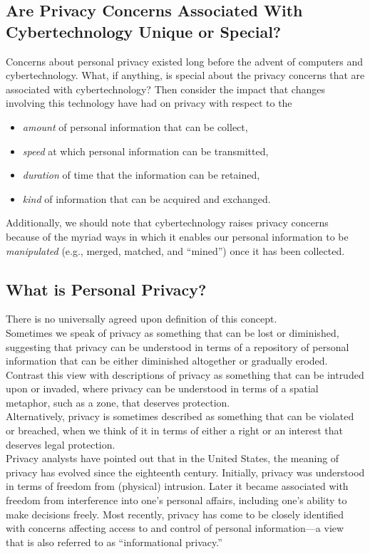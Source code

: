 \documentclass[12pt]{article}
\theoremstyle{definition}
\begin{document}
\subsection{Are Privacy Concerns Associated With Cybertechnology Unique or Special?}
Concerns about personal privacy existed long before the advent of computers and
cybertechnology. What, if anything, is special about the privacy concerns that are associated with cybertechnology? Then consider the impact that changes involving this technology have had on privacy with respect to the
\begin{itemize}
\item \textit{amount} of personal information that can be collect,
\item \textit{speed} at which personal information can be transmitted,
\item \textit{duration} of time that the information can be retained,
\item \textit{kind} of information that can be acquired and exchanged.
\end{itemize}
Additionally, we should note that cybertechnology raises privacy concerns because of the myriad ways in which it enables our personal information to be \textit{manipulated} (e.g., merged, matched, and “mined”) once it has been collected.
\subsection{What is Personal Privacy?}
There is no universally agreed upon definition of this concept.\\
Sometimes we speak of privacy as something that can be lost or diminished, suggesting that privacy can be understood in terms of a repository of personal information that can be either diminished altogether or gradually eroded.\\
Contrast this view with descriptions of privacy as something that can be intruded upon or invaded, where privacy can be understood in terms of a spatial metaphor, such as a zone, that deserves protection.\\
Alternatively, privacy is sometimes described as something that can be violated or breached, when we think of it in terms of either a right or an interest that deserves legal protection.\\
Privacy analysts have pointed out that in the United States, the meaning of privacy has evolved since the eighteenth century. Initially, privacy was understood in terms of freedom from (physical) intrusion. Later it became associated with freedom from interference into one’s personal affairs, including one’s ability to make decisions freely. Most recently, privacy has come to be closely identified with concerns affecting access to and control of personal information—a view that is also referred to as “informational privacy.”
\end{document}
